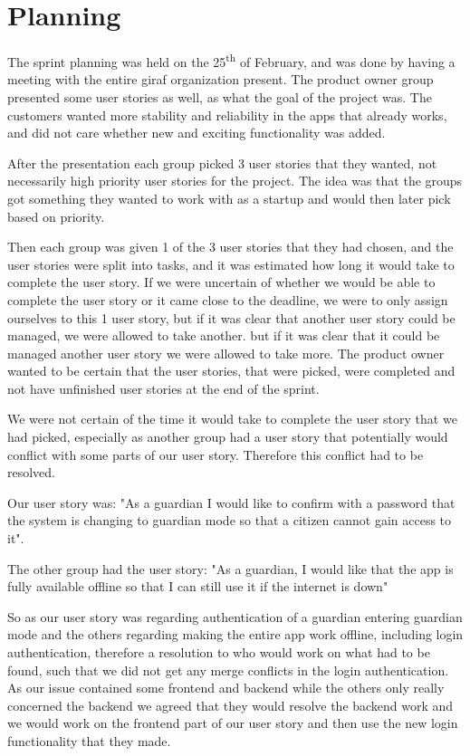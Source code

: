 \section{Planning}
The sprint planning was held on the 25\textsuperscript{th} of February, and was done by having a meeting with the entire giraf organization present. 
The product owner group presented some user stories as well, as what the goal of the project was. 
The customers wanted more stability and reliability in the apps that already works, and did not care whether new and exciting functionality was added. 

After the presentation each group picked 3 user stories that they wanted, not necessarily high priority user stories for the project. The idea was that the groups got something they wanted to work with as a startup and would then later pick based on priority.

Then each group was given 1 of the 3 user stories that they had chosen, and the user stories were split into tasks, and it was estimated how long it would take to complete the user story. If we were uncertain of whether we would be able to complete the user story or it came close to the deadline, we were to only assign ourselves to this 1 user story, but if it was clear that another user story could be managed, we were allowed to take another.
but if it was clear that it could be managed another user story we were allowed to take more. 
The product owner wanted to be certain that the user stories, that were picked, were completed and not have unfinished user stories at the end of the sprint.

We were not certain of the time it would take to complete the user story that we had picked, especially as another group had a user story that potentially would conflict with some parts of our user story. Therefore this conflict had to be resolved.

Our user story was: "As a guardian I would like to confirm with a password that the system is changing to guardian mode so that a citizen cannot gain access to it".

The other group had the user story: "As a guardian, I would like that the app is fully available offline so that I can still use it if the internet is down"

So as our user story was regarding authentication of a guardian entering guardian mode and the others regarding making the entire app work offline, including login authentication, therefore a resolution to who would work on what had to be found, such that we did not get any merge conflicts in the login authentication. As our issue contained some frontend and backend while the others only really concerned the backend we agreed that they would resolve the backend work and we would work on the frontend part of our user story and then use the new login functionality that they made.
